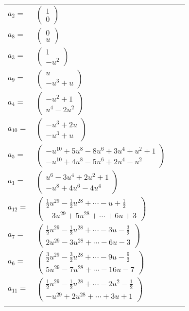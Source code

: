 \documentclass[1p]{elsarticle_modified}
\theoremstyle{definition}
\begin{document}
\begin{tabular}{m{7pt} m{180pt} m{7pt} m{180pt} }
\flushright $a_{2}=$&$\begin{pmatrix}1\\0\end{pmatrix}$ \\
\flushright $a_{8}=$&$\begin{pmatrix}0\\u\end{pmatrix}$ \\
\flushright $a_{3}=$&$\begin{pmatrix}1\\- u^2\end{pmatrix}$ \\
\flushright $a_{9}=$&$\begin{pmatrix}u\\- u^3+u\end{pmatrix}$ \\
\flushright $a_{4}=$&$\begin{pmatrix}- u^2+1\\u^4-2 u^2\end{pmatrix}$ \\
\flushright $a_{10}=$&$\begin{pmatrix}- u^3+2 u\\- u^3+u\end{pmatrix}$ \\
\flushright $a_{5}=$&$\begin{pmatrix}- u^{10}+5 u^8-8 u^6+3 u^4+u^2+1\\- u^{10}+4 u^8-5 u^6+2 u^4- u^2\end{pmatrix}$ \\
\flushright $a_{1}=$&$\begin{pmatrix}u^6-3 u^4+2 u^2+1\\- u^8+4 u^6-4 u^4\end{pmatrix}$ \\
\flushright $a_{12}=$&$\begin{pmatrix}\frac{1}{2} u^{29}-\frac{1}{2} u^{28}+\cdots- u+\frac{1}{2}\\-3 u^{29}+5 u^{28}+\cdots+6 u+3\end{pmatrix}$ \\
\flushright $a_{7}=$&$\begin{pmatrix}\frac{1}{2} u^{29}-\frac{1}{2} u^{28}+\cdots-3 u-\frac{3}{2}\\2 u^{29}-3 u^{28}+\cdots-6 u-3\end{pmatrix}$ \\
\flushright $a_{6}=$&$\begin{pmatrix}\frac{3}{2} u^{29}-\frac{3}{2} u^{28}+\cdots-9 u-\frac{9}{2}\\5 u^{29}-7 u^{28}+\cdots-16 u-7\end{pmatrix}$ \\
\flushright $a_{11}=$&$\begin{pmatrix}\frac{1}{2} u^{29}-\frac{1}{2} u^{28}+\cdots-2 u^2-\frac{1}{2}\\- u^{29}+2 u^{28}+\cdots+3 u+1\end{pmatrix}$\\&\end{tabular}
\end{document}
